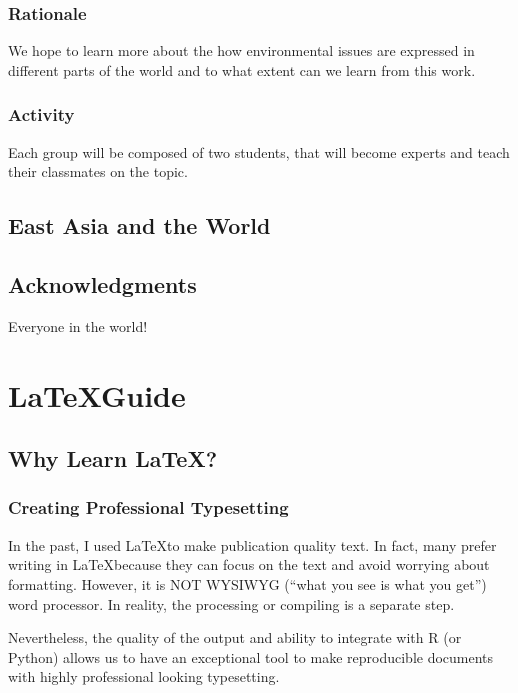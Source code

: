 \documentclass{book}\usepackage{knitr}
\begin{document}
\subsection{Rationale}

We hope to learn more about the how environmental issues are expressed in different parts of the world and to what extent can we learn from this work. 

\subsection{Activity}

Each group will be composed of two students, that will become experts and teach their classmates on the topic. 

\section{East Asia and the World}







\section{Acknowledgments}

Everyone in the world!




\chapter{\LaTeX Guide}\label{ch:guide}

\section*{Why Learn \LaTeX?}

\subsection*{Creating Professional Typesetting}

In the past, I used \LaTeX to make publication quality text. In fact, many prefer writing in \LaTeX because they can focus on the text and avoid worrying about formatting. However, it is NOT WYSIWYG (``what you see is what you get'') word processor. In reality, the processing or compiling is a separate step. 

Nevertheless, the quality of the output and ability to integrate with R (or Python) allows us to have an exceptional tool to make reproducible documents with highly professional looking typesetting.
\end{document}
